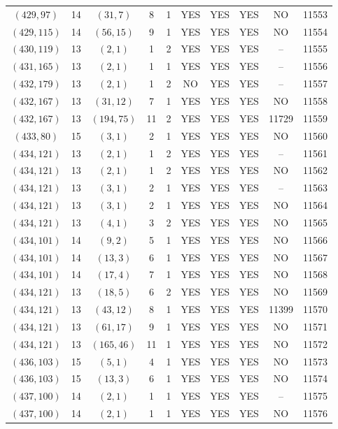 \begin{longtable}{|c|c|c|c|c|c|c|c|c|c|}
$(429, 97)$ & 14 & $(31, 7)$ & 8 & 1 & YES & YES & YES & NO & 11553\\
$(429, 115)$ & 14 & $(56, 15)$ & 9 & 1 & YES & YES & YES & NO & 11554\\
$(430, 119)$ & 13 & $(2, 1)$ & 1 & 2 & YES & YES & YES & -- & 11555\\
$(431, 165)$ & 13 & $(2, 1)$ & 1 & 1 & YES & YES & YES & -- & 11556\\
$(432, 179)$ & 13 & $(2, 1)$ & 1 & 2 & NO & YES & YES & -- & 11557\\
$(432, 167)$ & 13 & $(31, 12)$ & 7 & 1 & YES & YES & YES & NO & 11558\\
$(432, 167)$ & 13 & $(194, 75)$ & 11 & 2 & YES & YES & YES & 11729 & 11559\\
$(433, 80)$ & 15 & $(3, 1)$ & 2 & 1 & YES & YES & YES & NO & 11560\\
$(434, 121)$ & 13 & $(2, 1)$ & 1 & 2 & YES & YES & YES & -- & 11561\\
$(434, 121)$ & 13 & $(2, 1)$ & 1 & 2 & YES & YES & YES & NO & 11562\\
$(434, 121)$ & 13 & $(3, 1)$ & 2 & 1 & YES & YES & YES & -- & 11563\\
$(434, 121)$ & 13 & $(3, 1)$ & 2 & 1 & YES & YES & YES & NO & 11564\\
$(434, 121)$ & 13 & $(4, 1)$ & 3 & 2 & YES & YES & YES & NO & 11565\\
$(434, 101)$ & 14 & $(9, 2)$ & 5 & 1 & YES & YES & YES & NO & 11566\\
$(434, 101)$ & 14 & $(13, 3)$ & 6 & 1 & YES & YES & YES & NO & 11567\\
$(434, 101)$ & 14 & $(17, 4)$ & 7 & 1 & YES & YES & YES & NO & 11568\\
$(434, 121)$ & 13 & $(18, 5)$ & 6 & 2 & YES & YES & YES & NO & 11569\\
$(434, 121)$ & 13 & $(43, 12)$ & 8 & 1 & YES & YES & YES & 11399 & 11570\\
$(434, 121)$ & 13 & $(61, 17)$ & 9 & 1 & YES & YES & YES & NO & 11571\\
$(434, 121)$ & 13 & $(165, 46)$ & 11 & 1 & YES & YES & YES & NO & 11572\\
$(436, 103)$ & 15 & $(5, 1)$ & 4 & 1 & YES & YES & YES & NO & 11573\\
$(436, 103)$ & 15 & $(13, 3)$ & 6 & 1 & YES & YES & YES & NO & 11574\\
$(437, 100)$ & 14 & $(2, 1)$ & 1 & 1 & YES & YES & YES & -- & 11575\\
$(437, 100)$ & 14 & $(2, 1)$ & 1 & 1 & YES & YES & YES & NO & 11576\\

\end{longtable}
